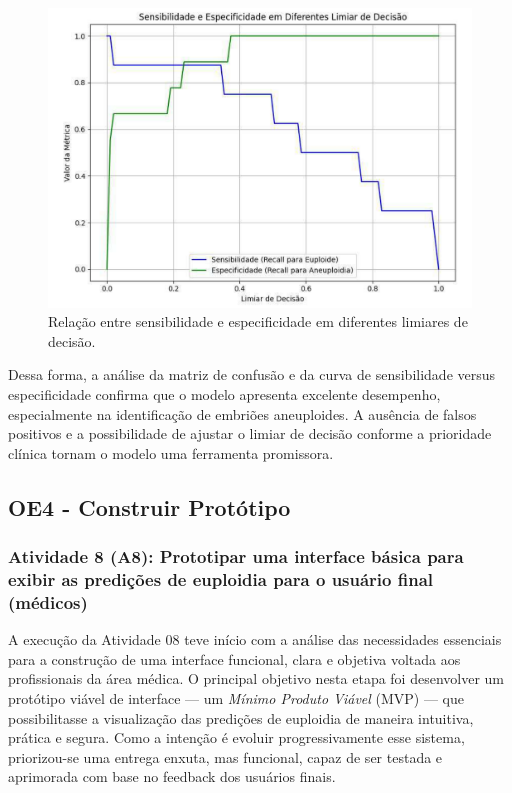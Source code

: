 \begin{figure}[h]
    \captionsetup{font=footnotesize, justification=centering, labelsep=period, position=above}
    \caption{Relação entre sensibilidade e especificidade em diferentes limiares de decisão.}
    \label{fig:sensibilidade}
    \centering
    \includegraphics[scale=0.45]{figuras/IA/sensibilidade.pdf}
\end{figure}
\FloatBarrier

Dessa forma, a análise da matriz de confusão e da curva de sensibilidade versus especificidade confirma que o modelo apresenta excelente desempenho, especialmente na identificação de embriões aneuploides. A ausência de falsos positivos e a possibilidade de ajustar o limiar de decisão conforme a prioridade clínica tornam o modelo uma ferramenta promissora.

\subsection{OE4 - Construir Protótipo}
\subsubsection{Atividade 8 (A8): Prototipar uma interface básica para exibir as predições de euploidia para o usuário final (médicos)}
A execução da Atividade 08 teve início com a análise das necessidades essenciais para a construção de uma interface funcional, clara e objetiva voltada aos profissionais da área médica. O principal objetivo nesta etapa foi desenvolver um protótipo viável de interface — um \textit{Mínimo Produto Viável} (MVP) — que possibilitasse a visualização das predições de euploidia de maneira intuitiva, prática e segura. Como a intenção é evoluir progressivamente esse sistema, priorizou-se uma entrega enxuta, mas funcional, capaz de ser testada e aprimorada com base no feedback dos usuários finais.

